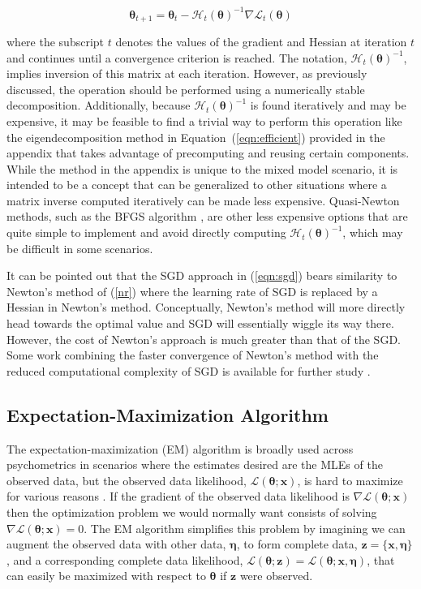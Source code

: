\documentclass[12pt]{article}
\begin{document}
\begin{equation}
\label{nr}
\bm{\theta}_{t+1} = \bm{\theta}_t - \mathcal{H}_t(\bm{\theta})^{-1} \nabla\mathcal{L}_t(\bm{\theta})
\end{equation}

\noindent where the subscript $t$ denotes the values of the gradient and Hessian at iteration $t$ and continues until a convergence criterion is reached. The notation, $\mathcal{H}_t(\bm{\theta})^{-1}$, implies inversion of this matrix at each iteration. However, as previously discussed, the operation should be performed using a numerically stable decomposition. Additionally, because $\mathcal{H}_t(\bm{\theta})^{-1}$ is found iteratively and may be expensive, it may be feasible to find a trivial way to perform this operation like the eigendecomposition method in Equation~(\ref{eqn:efficient}) provided in the appendix that takes advantage of precomputing and reusing certain components. While the method in the appendix is unique to the mixed model scenario, it is intended to be a concept that can be generalized to other situations where a matrix inverse computed iteratively can be made less expensive. Quasi-Newton methods, such as the BFGS algorithm \cite{Flet87}, are other less expensive options that are quite simple to implement and avoid directly computing $\mathcal{H}_t(\bm{\theta})^{-1}$, which may be difficult in some scenarios.

It can be pointed out that the SGD approach in (\ref{eqn:sgd}) bears similarity to Newton's method of (\ref{nr}) where the learning rate of SGD is replaced by a Hessian in Newton's method. Conceptually, Newton's method will more directly head towards the optimal value and SGD will essentially wiggle its way there. However, the cost of Newton's approach is much greater than that of the SGD. Some work combining the faster convergence of Newton's method with the reduced computational complexity of SGD is available for further study \cite{jascha,dampSGD}.    

\subsection*{Expectation-Maximization Algorithm}

The expectation-maximization (EM) algorithm is broadly used across psychometrics in scenarios where the estimates desired are the MLEs of the observed data, but the observed data likelihood, $\mathcal{L}(\bm{\theta};\bm{x})$, is hard to maximize for various reasons \cite{dempster}. If the gradient of the observed data likelihood is $\nabla\mathcal{L}(\bm{\theta};\bm{x})$ then the optimization problem we would normally want consists of solving $\nabla\mathcal{L}(\bm{\theta};\bm{x}) = 0$. The EM algorithm simplifies this problem by imagining we can augment the observed data with other data, $\bm{\eta}$, to form complete data, $\bm{z} = \{\bm{x}, \bm{\eta}\}$, and a corresponding complete data likelihood, $\mathcal{L}(\bm{\theta};\bm{z}) = \mathcal{L}(\bm{\theta};\bm{x},\bm{\eta})$, that can easily be maximized with respect to $\bm{\theta}$ if $\bm{z}$ were observed. 
\end{document}
